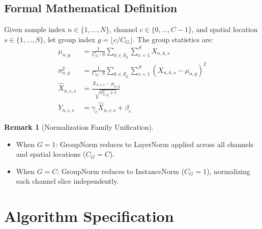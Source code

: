 \documentclass[11pt,a4paper]{article}
\theoremstyle{definition}
\newtheorem{remark}{Remark}[section]
\begin{document}
\subsection{Formal Mathematical Definition}
Given sample index $n \in \{1, \dots, N\}$, channel $c \in \{0, \dots, C-1\}$, and spatial location $s \in \{1, \dots, S\}$, let group index $g = \lfloor c / C_G \rfloor$. The group statistics are:
\begin{align}
\mu_{n, g} &= \frac{1}{C_G \cdot S} \sum_{k \in \mathcal{S}_g} \sum_{s=1}^S X_{n, k, s} \\
\sigma_{n, g}^2 &= \frac{1}{C_G \cdot S} \sum_{k \in \mathcal{S}_g} \sum_{s=1}^S (X_{n, k, s} - \mu_{n, g})^2 \\
\hat{X}_{n, c, s} &= \frac{X_{n, c, s} - \mu_{n, g}}{\sqrt{\sigma_{n, g}^2 + \epsilon}} \\
Y_{n, c, s} &= \gamma_c \hat{X}_{n, c, s} + \beta_c
\end{align}

\begin{remark}[Normalization Family Unification]
\begin{itemize}
    \item When $G = 1$: GroupNorm reduces to LayerNorm applied across all channels and spatial locations ($C_G = C$).
    \item When $G = C$: GroupNorm reduces to InstanceNorm ($C_G = 1$), normalizing each channel slice independently.
\end{itemize}
\end{remark}

\section{Algorithm Specification}
\end{document}
